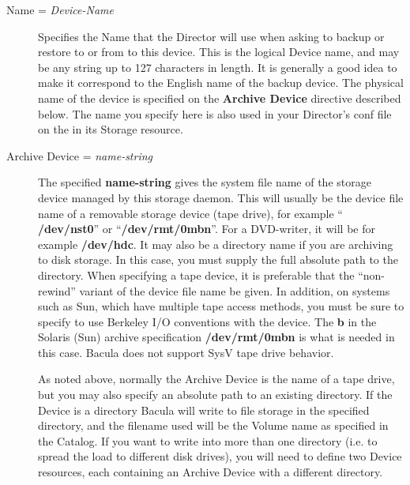 \begin{description}

\item [Name = {\it Device-Name}]
   Specifies the Name that the Director will use when asking to  backup or
restore to or from to this device. This is the logical  Device name, and may
be any string up to 127 characters in length.  It is generally a good idea to
make it correspond to the English  name of the backup device. The physical
name of the device is  specified on the {\bf Archive Device} directive
described below.  The name you specify here is also used in your Director's
conf  file on the 
  in its Storage
resource. 

\item [Archive Device = {\it name-string}]
   The specified {\bf name-string} gives the system file name of the  storage
device managed by this storage daemon. This will usually be  the device file
name of a removable storage device (tape drive),  for example ``{\bf
/dev/nst0}'' or ``{\bf /dev/rmt/0mbn}''.  For a DVD-writer, it will be for
example {\bf /dev/hdc}.  It may also be a directory name if you are archiving
to disk storage.  In this case, you must supply the full absolute path to the
directory.  When specifying a tape device, it is preferable that the 
``non-rewind'' variant of the device file name be given.  In addition, on
systems such as Sun, which have multiple tape  access methods, you must be
sure to specify to use  Berkeley I/O conventions with the device. The {\bf b}
in the Solaris (Sun)  archive specification {\bf /dev/rmt/0mbn} is what is
needed in  this case. Bacula does not support SysV tape drive behavior.  

As noted above, normally the Archive Device is the name of a  tape drive, but
you may also specify an absolute path to  an existing directory. If the Device
is a directory  Bacula will write to file storage in the specified directory,
and  the filename used will be the Volume name as specified in the  Catalog.
If you want to write into more than one directory (i.e.  to spread the load to
different disk drives), you will need to define  two Device resources, each
containing an Archive Device with a  different directory.  


\end{description}
